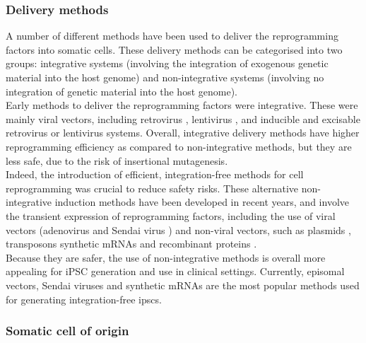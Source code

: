 \subsubsection{Delivery methods}
\label{sec:ipsc_delivery}

A number of different methods have been used to deliver the reprogramming factors into somatic cells. 
These delivery methods can be categorised into two groups: integrative systems (involving the integration of exogenous genetic material into the host genome) and non-integrative systems (involving no integration of genetic material into the host genome). \\

Early methods to deliver the reprogramming factors were integrative.
These were mainly viral vectors, including retrovirus \cite{takahashi2006induction, takahashi2007induction, wernig2007vitro, okita2007generation, yamanaka2007strategies, maherali2007directly}, lentivirus \cite{yu2007induced, blelloch2007generation}, and 
inducible and 
excisable retrovirus \cite{soldner2009parkinson} or
lentivirus \cite{maherali2008high} systems. 
Overall, integrative delivery methods have higher reprogramming efficiency as compared to non-integrative methods, but they are less safe, due to the risk of insertional mutagenesis. \\

Indeed, the introduction of efficient, integration-free methods for cell reprogramming was crucial to reduce safety risks. 
These alternative non-integrative induction methods have been developed in recent years, and involve the transient expression of reprogramming factors, including the use of viral vectors (adenovirus \cite{stadtfeld2008reprogramming} and Sendai virus \cite{fusaki2009efficient, nishimura2011development}) and non-viral vectors, such as plasmids \cite{yu2009human, okita2008generation, okita2011more, jia2010nonviral}, transposons \cite{kaji2009virus, woltjen2009piggybac, yu2009human} synthetic mRNAs \cite{warren2010highly} and recombinant proteins \cite{kim2009generation}. \\

Because they are safer, the use of non-integrative methods is overall more appealing for iPSC generation and use in clinical settings.
Currently, episomal vectors, Sendai viruses and synthetic mRNAs are the most popular methods used for generating integration-free \glspl{ipsc}. 


\subsubsection{Somatic cell of origin}
\label{sec:ipsc_somatic_cell}

